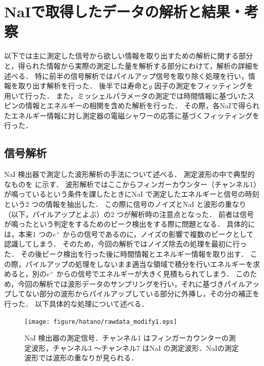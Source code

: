
%
\section{NaIで取得したデータの解析と結果・考察}
以下では主に測定した信号から欲しい情報を取り出すための解析に関する部分と，得られた情報から実際の測定した量を解析する部分にわけて，解析の詳細を述べる．
特に前半の信号解析ではパイルアップ信号を取り除く処理を行い，情報を取り出す解析を行った．
後半では寿命と$g$ 因子の測定をフィッティングを用いて行った．
また，ミッシェルパラメータの測定では時間情報に基づいたスピンの情報とエネルギーの相関を含めた解析を行った．
その際，各NaIで得られたエネルギー情報に対し測定器の電磁シャワーの応答に基づくフィッティングを行った．

\subsection{信号解析}
NaI 検出器で測定した波形解析の手法について述べる．
測定波形の中で典型的なものを に示す．
波形解析ではここからフィンガーカウンター（チャンネル1）が鳴っているという条件を課したときにNaI で測定したエネルギーと信号の時刻という2 つの情報を抽出した．
この際に信号のノイズとNaI と波形の重なり（以下，パイルアップとよぶ）の2 つが解析時の注意点となった．
前者は信号が鳴ったという判定をするためのピーク検出をする際に問題となる．
具体的には，本来1 つの$e^+$ からの信号であるのに，ノイズの影響で複数のピークとして認識してしまう．
そのため，今回の解析ではノイズ除去の処理を最初に行った．
その後ピーク検出を行った後に時間情報とエネルギー情報を取り出す．
この際，パイルアップの処理をしないまま適当な領域で積分を行いエネルギーを求めると，別の$e^+$ からの信号でエネルギーが大きく見積もられてしまう．
このため，今回の解析では波形データのサンプリングを行い，それに基づきパイルアップしてない部分の波形からパイルアップしている部分に外挿し，その分の補正を行った．
以下具体的な処理について述べる．

\begin{figure}[hbt]
\centering
\texttt{[image: figure/hatano/rawdata\_modify1.eps]}
\caption{NaI 検出器の測定信号．チャンネル1 はフィンガーカウンターの測定波形，チャンネル3 〜チャンネル7 はNaI の測定波形．NaIの測定波形では波形の重なりが見られる．}
\label{hatano_fig:rawdata}
\end{figure}

